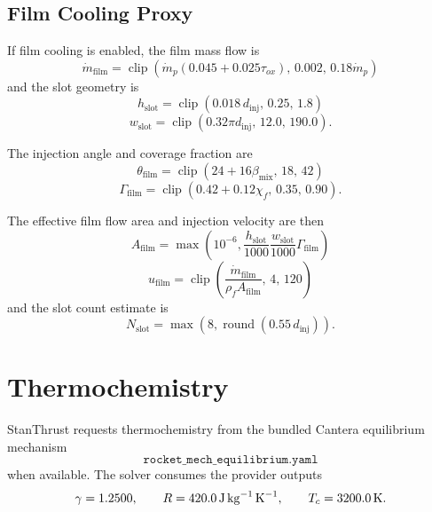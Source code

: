 \documentclass[11pt]{article}
\newcommand{\clip}{\operatorname{clip}}
\newcommand{\mdot}{\dot{m}}
\newcommand{\mdotp}{\dot{m}_{p}}
\begin{document}
\subsection{Film Cooling Proxy}
If film cooling is enabled, the film mass flow is
\begin{equation}
\mdot_{\text{film}}
=
\clip\!\left(
\mdotp(0.045+0.025\tau_{ox}),
\,
0.002,\,
0.18\mdotp
\right)
\label{eq:film-mdot}
\end{equation}
and the slot geometry is
\begin{equation}
h_{\text{slot}}=\clip(0.018\,d_{\text{inj}},\,0.25,\,1.8)
\label{eq:film-height}
\end{equation}
\begin{equation}
w_{\text{slot}}=\clip(0.32\pi d_{\text{inj}},\,12.0,\,190.0).
\label{eq:film-width}
\end{equation}

The injection angle and coverage fraction are
\begin{equation}
\theta_{\text{film}}=\clip(24+16\beta_{\text{mix}},\,18,\,42)
\label{eq:film-angle}
\end{equation}
\begin{equation}
\Gamma_{\text{film}}=\clip(0.42+0.12\chi_f,\,0.35,\,0.90).
\label{eq:film-coverage}
\end{equation}

The effective film flow area and injection velocity are then
\begin{equation}
A_{\text{film}}=\max\!\left(10^{-6},\frac{h_{\text{slot}}}{1000}\frac{w_{\text{slot}}}{1000}\Gamma_{\text{film}}\right)
\label{eq:film-area}
\end{equation}
\begin{equation}
u_{\text{film}}
=
\clip\!\left(
\frac{\mdot_{\text{film}}}{\rho_f A_{\text{film}}},
\,
4,\,
120
\right)
\label{eq:film-velocity}
\end{equation}
and the slot count estimate is
\begin{equation}
N_{\text{slot}}=\max\!\left(8,\operatorname{round}(0.55\,d_{\text{inj}})\right).
\label{eq:film-slots}
\end{equation}

\section{Thermochemistry}
StanThrust requests thermochemistry from the bundled Cantera equilibrium mechanism
\[
\texttt{rocket\_mech\_equilibrium.yaml}
\]
when available. The solver consumes the provider outputs
\[
\gamma=1.2500,\qquad
R=\SI{420.0}{J\,kg^{-1}\,K^{-1}},\qquad
T_c=\SI{3200.0}{K}.
\]
\end{document}
